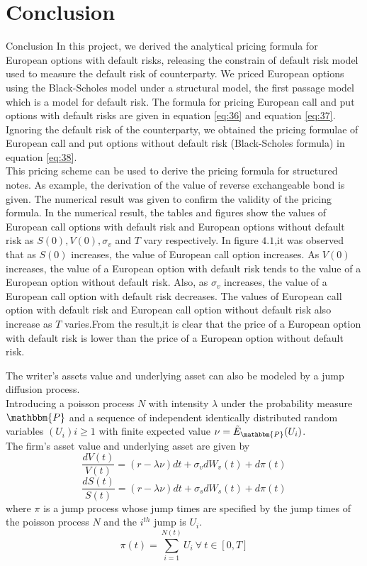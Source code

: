 \documentclass[pdf]{beamer}
\begin{document}
\section{Conclusion}
\begin{frame}[allowframebreaks]{Conclusion}
In this project, we derived the analytical pricing formula for European options with default risks, releasing the constrain of default risk model used to measure the default risk of counterparty. We priced European options using the Black-Scholes model under a structural model, the first passage model which is a model for default risk. The formula for pricing European call and put options with default risks are given in equation \eqref{eq:36} and equation \eqref{eq:37}.\\ Ignoring the default risk of the counterparty, we obtained the pricing formulae of European call and put options without default risk (Black-Scholes formula) in equation \eqref{eq:38}.\\
This pricing scheme can be used to derive the pricing formula for structured notes. As example, the derivation of the value of reverse exchangeable bond is given. The numerical result was given to confirm the validity of the pricing formula. In the numerical result, the tables and figures show the values of European call options with default risk and European options without default risk as $S(0),V(0),\sigma_{v}$ and $T$ vary respectively. In figure $4.1$,it was observed that as $S(0)$ increases, the value of European call option increases. As $V(0)$ increases, the value of a European option with default risk tends to the value of a European option without default risk. Also, as $\sigma_{v}$ increases, the value of a European call option with default risk decreases. The values of European call option with default risk and European call option without default risk also increase as $T$ varies.From the result,it is clear that the price of a European option with default risk is lower than the price of a European option without default risk. 
\par The writer's assets value and underlying asset can also be modeled by a jump diffusion process.\\
Introducing a poisson process $N$ with intensity $\lambda$ under the probability measure $\mathbbm{P}$ and a sequence of independent identically distributed random variables $(U_{i})i \geq 1$ with finite expected value $\nu= \tilde{E}_{\mathbbm{P}}(U_{i})$.\\
The firm's asset value and underlying asset are given by
\begin{equation}
\label{eq:bimbo}
\frac{dV(t)}{V(t)} = (r-\lambda \nu)dt + \sigma_{v} dW_{v}(t) + d \pi(t)
\end{equation}
\begin{equation}
\label{eq:bimbola}
\frac{dS(t)}{S(t)} = (r- \lambda \nu)dt + \sigma_{s} dW_{s}(t) + d \pi(t)
\end{equation}
where $\pi$ is a jump process whose jump times are specified by the jump times of the poisson process $N$ and the $i^{th}$ jump is $U_{i}$.
$$
\pi(t) = \sum_{i=1}^{N(t)} U_{i}~\forall~t \in[0,T]
$$
\end{frame}
\end{document}
